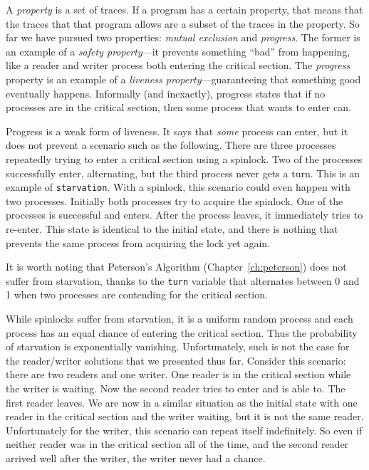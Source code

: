 \documentclass{report}
\begin{document}
A \emph{property}
is a set of traces.
If a program has a certain property, that means that the traces that that
program allows are a subset of the traces in the property.
So far we have pursued two properties: \emph{mutual exclusion}
and \emph{progress}.  The former is an example of a
\emph{safety property}---it prevents something ``bad'' from
happening, like a reader and writer process both entering the
critical section.  The \emph{progress} property is an example
of a \emph{liveness property}---guaranteeing that something good
eventually happens.
Informally (and inexactly), progress states that if no processes
are in the critical section, then some process that wants to enter
can.

Progress is a weak form of liveness.  It says that \emph{some}
process can enter, but it does not prevent a scenario such as
the following.  There are three processes repeatedly trying to
enter a critical section using a spinlock.  Two of
the processes successfully enter, alternating, but the third
process never gets a turn.  This is an example of
\texttt{starvation}.  With a spinlock, this scenario could
even happen with two processes.  Initially both processes
try to acquire the spinlock.  One of the processes is
successful and enters.  After the process leaves, it immediately
tries to re-enter.  This state is identical to the initial
state, and there is nothing that prevents the same process
from acquiring the lock yet again.

It is worth noting that Peterson's Algorithm (Chapter~\ref{ch:peterson})
does not suffer from starvation, thanks to the \texttt{turn} variable
that alternates between 0 and 1 when two processes are contending for
the critical section.

While spinlocks suffer from starvation, it is a uniform random
process and each process has an equal chance of entering the critical
section.  Thus the probability of starvation is exponentially vanishing.
Unfortunately, such is not the case for the
reader/writer solutions that we presented thus far.
Consider this scenario: there are two readers and one writer.  One reader
is in the critical section while the writer is waiting.  Now the
second reader tries to enter and is able to.  The first reader leaves.
We are now in a similar situation as the initial state with one reader
in the critical section and the writer waiting, but it is not the same
reader.  Unfortunately for the writer, this scenario can repeat itself
indefinitely.  So even if neither reader was in the critical section
all of the time, and the second reader arrived well after the writer,
the writer never had a chance.
\end{document}
